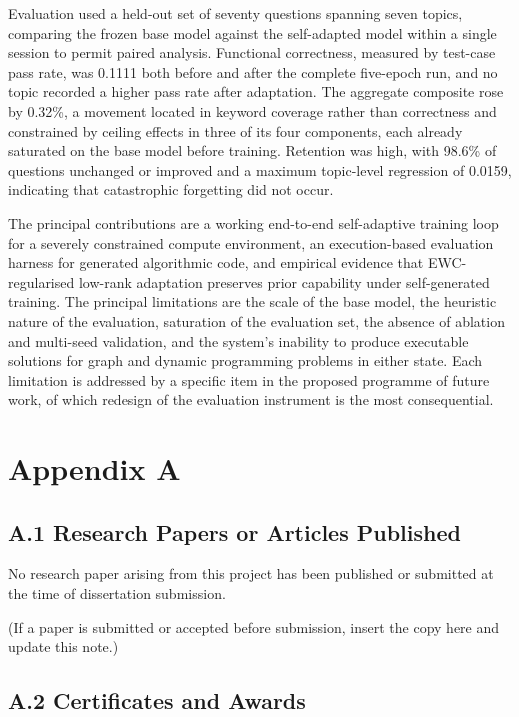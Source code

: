 \documentclass[12pt,a4paper]{report}
\begin{document}
Evaluation used a held-out set of seventy questions spanning seven topics, comparing the frozen base model against the self-adapted model within a single session to permit paired analysis. Functional correctness, measured by test-case pass rate, was 0.1111 both before and after the complete five-epoch run, and no topic recorded a higher pass rate after adaptation. The aggregate composite rose by 0.32\%, a movement located in keyword coverage rather than correctness and constrained by ceiling effects in three of its four components, each already saturated on the base model before training. Retention was high, with 98.6\% of questions unchanged or improved and a maximum topic-level regression of 0.0159, indicating that catastrophic forgetting did not occur.

The principal contributions are a working end-to-end self-adaptive training loop for a severely constrained compute environment, an execution-based evaluation harness for generated algorithmic code, and empirical evidence that EWC-regularised low-rank adaptation preserves prior capability under self-generated training. The principal limitations are the scale of the base model, the heuristic nature of the evaluation, saturation of the evaluation set, the absence of ablation and multi-seed validation, and the system's inability to produce executable solutions for graph and dynamic programming problems in either state. Each limitation is addressed by a specific item in the proposed programme of future work, of which redesign of the evaluation instrument is the most consequential.

\chapter*{Appendix A}

\section*{A.1 Research Papers or Articles Published}

No research paper arising from this project has been published or submitted at the time of dissertation submission.

(If a paper is submitted or accepted before submission, insert the copy here and update this note.)

\section*{A.2 Certificates and Awards}
\end{document}
